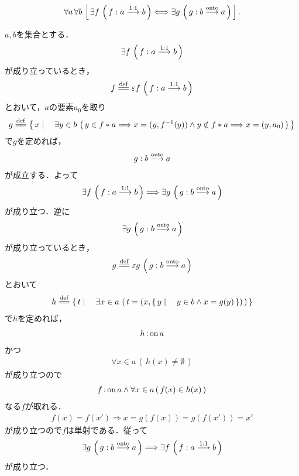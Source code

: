 	\begin{screen}
		\begin{thm}
			\begin{align}
				\forall a\, \forall b\,
				\left[\, \exists f\, \left(\, f:a \overset{\mathrm{1:1}}{\longrightarrow} b\, \right)
				\Longleftrightarrow \exists g\, \left(\, g:b \overset{\mathrm{onto}}{\longrightarrow} a\, \right)\, \right].
			\end{align}
		\end{thm}
	\end{screen}
	
	\begin{sketch}
		$a,b$を集合とする．
		\begin{align}
			\exists f\, \left(\, f:a \overset{\mathrm{1:1}}{\longrightarrow} b\, \right)
		\end{align}
		が成り立っているとき，
		\begin{align}
			f \defeq \varepsilon f\, \left(\, f:a \inj b\, \right)
		\end{align}
		とおいて，$a$の要素$a_0$を取り
		\begin{align}
			g \defeq \Set{x}{\exists y \in b\, \left(\, y \in f \ast a \Longrightarrow x=(y,f^{-1}(y))
			\wedge y \notin f \ast a \Longrightarrow x=(y,a_0)\, \right)}
		\end{align}
		で$g$を定めれば，
		\begin{align}
			g:b \overset{\mathrm{onto}}{\longrightarrow} a
		\end{align}
		が成立する．よって
		\begin{align}
			\exists f\, \left(\, f:a \overset{\mathrm{1:1}}{\longrightarrow} b\, \right)
				\Longrightarrow \exists g\, \left(\, g:b \overset{\mathrm{onto}}{\longrightarrow} a\, \right)
		\end{align}
		が成り立つ．逆に
		\begin{align}
			\exists g\, \left(\, g:b \overset{\mathrm{onto}}{\longrightarrow} a\, \right)
		\end{align}
		が成り立っているとき，
		\begin{align}
			g \defeq \varepsilon g\, \left(\, g:b \srj a\, \right)
		\end{align}
		とおいて
		\begin{align}
			h \defeq \Set{t}{\exists x \in a\, \left(\, t=(x,\Set{y}{y \in b \wedge x = g(y)})\, \right)}
		\end{align}
		で$h$を定めれば，
		\begin{align}
			h \operatorname*{:on} a
		\end{align}
		かつ
		\begin{align}
			\forall x \in a\, (\, h(x) \neq \emptyset\, )
		\end{align}
		が成り立つので
		\begin{align}
			f \operatorname*{:on} a \wedge \forall x \in a\, (\, f(x) \in h(x)\, )
		\end{align}
		なる$f$が取れる．
		\begin{align}
			f(x) = f(x') \Longrightarrow x = g(f(x)) = g(f(x')) = x'
		\end{align}
		が成り立つので$f$は単射である．従って
		\begin{align}
			\exists g\, \left(\, g:b \overset{\mathrm{onto}}{\longrightarrow} a\, \right)
			\Longrightarrow \exists f\, \left(\, f:a \overset{\mathrm{1:1}}{\longrightarrow} b\, \right)
		\end{align}
		が成り立つ．
		\QED
	\end{sketch}
	
